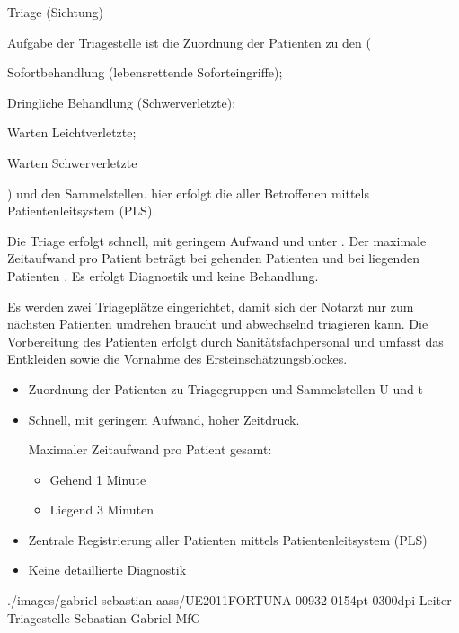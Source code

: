 \TextSlideTeaser
{Triage (Sichtung)}%
{%
Aufgabe der Triagestelle ist die Zuordnung der Patienten zu den 
(\begin{inparadesc}
\item[\Code{I}] Sofortbehandlung (lebensrettende Soforteingriffe); 
\item[\Code{II}] Dringliche Behandlung (Schwerverletzte); 
\item[\Code{III}] Warten Leichtverletzte; 
\item[\Code{IV}] Warten Schwerverletzte
\end{inparadesc}) und den Sammelstellen.  hier erfolgt die
 aller Betroffenen mittels
Patientenleitsystem (PLS).

Die Triage erfolgt schnell, mit geringem Aufwand und unter
. Der maximale Zeitaufwand pro Patient
beträgt bei gehenden Patienten  und bei liegenden
Patienten . Es erfolgt 
Diagnostik und keine Behandlung.


Es werden zwei Triageplätze eingerichtet, damit sich der Notarzt nur zum
nächsten Patienten umdrehen braucht und abwechselnd triagieren kann. 
Die Vorbereitung des Patienten erfolgt durch Sanitätsfachpersonal und umfasst
das Entkleiden sowie die Vornahme des Ersteinschätzungsblockes. }%
{
\begin{itemize}
  \item Zuordnung der Patienten zu Triagegruppen
   und Sammelstellen U und t
  \item Schnell, mit geringem Aufwand, hoher Zeitdruck.
  
  Maximaler Zeitaufwand pro Patient gesamt:
  \begin{itemize}
    \item Gehend 1 Minute
    \item Liegend 3 Minuten
  \end{itemize}
  \item Zentrale Registrierung aller Patienten mittels Patientenleitsystem
  (PLS)
  \item Keine detaillierte Diagnostik
\end{itemize}}%
{./images/gabriel-sebastian-aass/UE2011FORTUNA-00932-0154pt-0300dpi}%
{Leiter Triagestelle}%
{}%
{Sebastian Gabriel}%
{MfG}%







